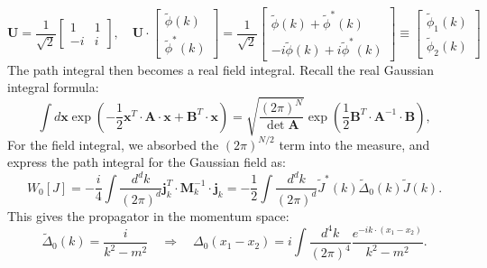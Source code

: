 \documentclass[aps,prb,superscriptaddress,nofootinbib]{revtex4}
\begin{document}
\begin{equation*}
	\mathbf U = \frac{1}{\sqrt 2} \left[\begin{array}{cc}
		1 & 1 \\
		-i & i
	\end{array}\right], \quad
	\mathbf U \cdot \left[
	\begin{array}{c}
		\tilde{\phi}(k) \\ 
		\tilde{\phi}^*(k) 
	\end{array}\right] 
	= \frac{1}{\sqrt 2}\left[
	\begin{array}{c}
		\tilde\phi(k)+\tilde\phi^*(k) \\ 
		-i\tilde\phi(k)+i\tilde\phi^*(k)
	\end{array}\right]
	\equiv \left[
	\begin{array}{c}
		\tilde\phi_1(k) \\ 
		\tilde\phi_2(k) 
	\end{array}\right]
\end{equation*}
The path integral then becomes a real field integral.
Recall the real Gaussian integral formula:
\begin{equation}
	\int d\mathbf x \exp\left(-\frac{1}{2}\mathbf{x}^T \cdot \mathbf A \cdot \mathbf{x} + \mathbf{B}^T \cdot \mathbf{x}\right) 
	= \sqrt{\frac{(2\pi)^N}{\det{\mathbf A}}}\exp\left(\frac{1}{2}\mathbf{B}^T \cdot \mathbf{A}^{-1} \cdot \mathbf{B}\right),
	\label{eq:real-gaussian-integral}
\end{equation}
For the field integral, we absorbed the $(2\pi)^{N/2}$ term into the measure, and express the path integral for the Gaussian field as:
\begin{equation}
	W_0[J] 
	= -\frac{i}{4}\int \frac{d^d k}{(2\pi)^d} \mathbf j^T_k \cdot \mathbf M^{-1}_k \cdot \mathbf j_k
	= -\frac{1}{2} \int \frac{d^d k}{(2\pi)^d}  \tilde{J}^*(k) \tilde{\Delta}_0(k) \tilde{J}(k).
\end{equation}
This gives the propagator in the momentum space:
\begin{equation}
	\tilde{\Delta}_0(k) = \frac{i}{k^2-m^2}
	\quad \Longrightarrow \quad 
	\Delta_0(x_1-x_2) = i\int\frac{d^{4} k}{(2\pi)^{4}} \frac{e^{-i k\cdot (x_1-x_2)}}{k^2-m^2}.
\end{equation}
\end{document}
